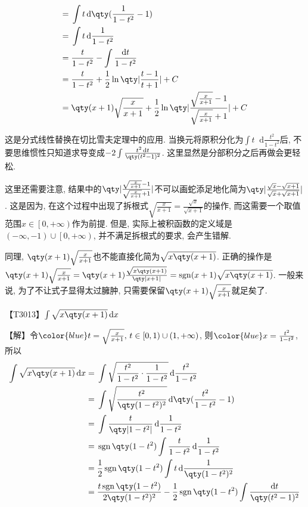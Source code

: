 \documentclass{ctexbook}
\DeclareMathOperator{\sgn}{sgn}
\newcommand*{\dif}{\mathop{}\!\mathrm{d}}
\begin{document}
{\begin{align*}
={}&\int t\dif{\qty(\frac{1}{1-t^{2}}-1)}\\
={}&\int t\dif{\frac{1}{1-t^{2}}}\\
={}&\frac{t}{1-t^{2}}-\int\frac{\dif{t}}{1-t^{2}}\\
={}&\frac{t}{1-t^{2}}+\frac{1}{2}\ln\qty|\frac{t-1}{t+1}|+C\\
={}&\qty(x+1)\sqrt{\frac{x}{x+1}}+\frac{1}{2}\ln\qty|\frac{\sqrt{\frac{x}{x+1}}-1}{\sqrt{\frac{x}{x+1}}+1}|+C
\end{align*}\par
{\kaishu 这是分式线性替换在切比雪夫定理中的应用. 当换元将原积分化为$\int t\dif{\frac{t^{2}}{1-t^{2}}}$后, 不要思维惯性只知道求导变成$-2\int\frac{t^{2}\dif{t}}{\qty(t^{2}-1)^{2}}$. 这里显然是分部积分之后再做会更轻松. \par
这里还需要注意, 结果中的$\qty|\frac{\sqrt{\frac{x}{x+1}}-1}{\sqrt{\frac{x}{x+1}}+1}|$不可以画蛇添足地化简为$\qty|\frac{\sqrt{x}-\sqrt{x+1}}{\sqrt{x}+\sqrt{x+1}}|$. 这是因为, 在这个过程中出现了拆根式$\sqrt{\frac{x}{x+1}}=\frac{\sqrt{x}}{\sqrt{x+1}}$的操作, 而这需要一个取值范围$x\in\left[0,+\infty\right)$作为前提. 但是, 实际上被积函数的定义域是$\left(-\infty,-1\right)\cup\left[0,+\infty\right)$, 并不满足拆根式的要求, 会产生错解. \par
同理, $\qty(x+1)\sqrt{\frac{x}{x+1}}$也不能直接化简为$\sqrt{x\qty(x+1)}$. 正确的操作是$\qty(x+1)\sqrt{\frac{x}{x+1}}=\qty(x+1)\frac{\sqrt{x\qty(x+1)}}{\qty|x+1|}=\sgn(x+1)\sqrt{x\qty(x+1)}$. 一般来说, 为了不让式子显得太过臃肿, 只需要保留$\qty(x+1)\sqrt{\frac{x}{x+1}}$就足矣了. \par}
{\color{red}【T3013】}$\int\sqrt{x\qty(x+1)}\dif{x}$\par
【解】令$\color{blue}t=\sqrt{\frac{x}{x+1}},\,t\in\left[0,1\right)\cup\left(1,+\infty\right)$, 则$\color{blue}x=\frac{t^{2}}{1-t^{2}}$, 所以
\begin{align*}
\int\sqrt{x\qty(x+1)}\dif{x}={}&\int\sqrt{\frac{t^{2}}{1-t^{2}}\cdot\frac{1}{1-t^{2}}}\dif{\frac{t^{2}}{1-t^{2}}}\\
={}&\int\sqrt{\frac{t^{2}}{\qty(1-t^{2})^{2}}}\dif{\qty(\frac{t^{2}}{1-t^{2}}-1)}\\
={}&\int\frac{t}{\qty|1-t^{2}|}\dif{\frac{1}{1-t^{2}}}\\
={}&\sgn{\qty(1-t^{2})}\int\frac{t}{1-t^{2}}\dif{\frac{1}{1-t^{2}}}\\
={}&\frac{1}{2}\sgn{\qty(1-t^{2})}\int t\dif{\frac{1}{\qty(1-t^{2})^{2}}}\\
={}&\frac{t\sgn{\qty(1-t^{2})}}{2\qty(1-t^{2})^{2}}-\frac{1}{2}\sgn{\qty(1-t^{2})}\int\frac{\dif{t}}{\qty(t^{2}-1)^{2}}

\end{align*}}
\end{document}
